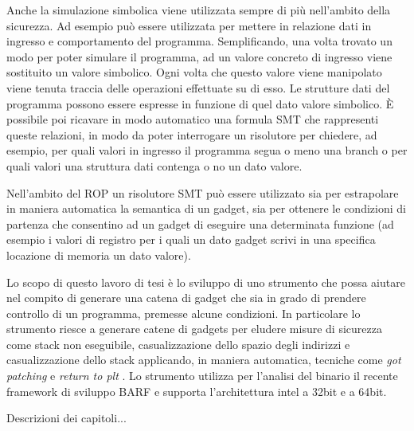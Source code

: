 Anche la simulazione simbolica viene utilizzata sempre di più
nell'ambito della sicurezza. Ad esempio può essere utilizzata per
mettere in relazione dati in ingresso e comportamento del
programma. Semplificando, una volta trovato un modo per poter simulare
il programma, ad un valore concreto di ingresso viene sostituito un
valore simbolico. Ogni volta che questo valore viene manipolato viene
tenuta traccia delle operazioni effettuate su di esso. Le strutture
dati del programma possono essere espresse in funzione di quel dato
valore simbolico. È possibile poi ricavare in modo automatico una
formula SMT che rappresenti queste relazioni, in modo da poter
interrogare un risolutore per chiedere, ad esempio, per quali valori
in ingresso il programma segua o meno una branch o per quali valori
una struttura dati contenga o no un dato valore.

Nell'ambito del ROP un risolutore SMT può essere utilizzato sia per
estrapolare in maniera automatica la semantica di un gadget, sia per
ottenere le condizioni di partenza che consentino ad un gadget di
eseguire una determinata funzione (ad esempio i valori di registro per
i quali un dato gadget scrivi in una specifica locazione di memoria un
dato valore).

Lo scopo di questo lavoro di tesi è lo sviluppo di uno strumento che
possa aiutare nel compito di generare una catena di gadget che sia in
grado di prendere controllo di un programma, premesse alcune
condizioni. In particolare lo strumento riesce a generare catene di
gadgets per eludere misure di sicurezza come stack non eseguibile,
casualizzazione dello spazio degli indirizzi e casualizzazione dello
stack applicando, in maniera automatica, tecniche come \emph{got
  patching} e \emph{return to plt} \cite{roglia:2009}. Lo strumento
utilizza per l'analisi del binario il recente framework di sviluppo
BARF \cite{Heitman-14} e supporta l'architettura intel a 32bit e a
64bit.

Descrizioni dei capitoli...




